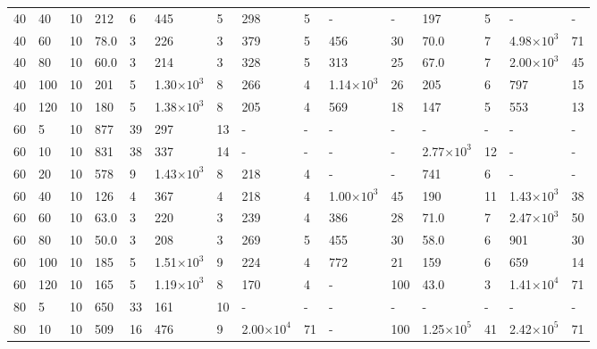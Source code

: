 \begin{table}[!ht]
\begin{center}
{\begin{tabular}{|l|l|l||l|l|l|l|l|l||l|l|l|l|l|l|}
40	&	40	&	10	&	212	&	6	&	445	&	5	&	298	&	5	&	-	&	-	&	197	&	5	&	-	&	-	\\



40	&	60	&	10	&	78.0	&	3	&	226	&	3	&	379	&	5	&	456	&	30	&	70.0	&	7	&	4.98$\times10^3$	&	71	\\



40	&	80	&	10	&	60.0	&	3	&	214	&	3	&	328	&	5	&	313	&	25	&	67.0	&	7	&	2.00$\times10^3$	&	45	\\

40	&	100	&	10	&	201	&	5	&	1.30$\times10^3$	&	8	&	266	&	4	&	1.14$\times10^3$	&	26	&	205	&	6	&	797	&	15	\\

40	&	120	&	10	&	180	&	5	&	1.38$\times10^3$	&	8	&	205	&	4	&	569	&	18	&	147	&	5	&	553	&	13	\\

60	&	5	&	10	&	877	&	39	&	297	&	13	&	-	&	-	&	-	&	-	&	-	&	-	&	-	&	-	\\
60	&	10	&	10	&	831	&	38	&	337	&	14	&	-	&	-	&	-	&	-	&	2.77$\times10^3$	&	12	&	-	&	-	\\

60	&	20	&	10	&	578	&	9	&	1.43$\times10^3$	&	8	&	218	&	4	&	-	&	-	&	741	&	6	&	-	&	-	\\



60	&	40	&	10	&	126	&	4	&	367	&	4	&	218	&	4	&	1.00$\times10^3$	&	45	&	190	&	11	&	1.43$\times10^3$	&	38	\\



60	&	60	&	10	&	63.0	&	3	&	220	&	3	&	239	&	4	&	386	&	28	&	71.0	&	7	&	2.47$\times10^3$	&	50	\\



60	&	80	&	10	&	50.0	&	3	&	208	&	3	&	269	&	5	&	455	&	30	&	58.0	&	6	&	901	&	30	\\

60	&	100	&	10	&	185	&	5	&	1.51$\times10^3$	&	9	&	224	&	4	&	772	&	21	&	159	&	6	&	659	&	14	\\

60	&	120	&	10	&	165	&	5	&	1.19$\times10^3$	&	8	&	170	&	4	&	-	&	100	&	43.0	&	3	&	1.41$\times10^4$	&	71	\\

80	&	5	&	10	&	650	&	33	&	161	&	10	&	-	&	-	&	-	&	-	&	-	&	-	&	-	&	-	\\
80	&	10	&	10	&	509	&	16	&	476	&	9	&	2.00$\times10^4$	&	71	&	-	&	100	&	1.25$\times10^5$	&	41	&	2.42$\times10^5$	&	71	\\


\end{tabular}}
\end{center}
\end{table}
